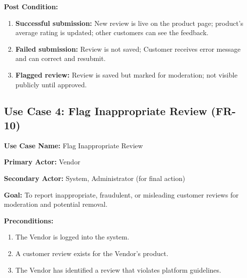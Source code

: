 \textbf{Post Condition:}
\begin{enumerate}
    \item \textbf{Successful submission:} New review is live on the product page; product's average rating is updated; other customers can see the feedback.
    \item \textbf{Failed submission:} Review is not saved; Customer receives error message and can correct and resubmit.
    \item \textbf{Flagged review:} Review is saved but marked for moderation; not visible publicly until approved.
\end{enumerate}


\subsection*{Use Case 4: Flag Inappropriate Review (FR-10)}

\textbf{Use Case Name:} Flag Inappropriate Review

\textbf{Primary Actor:} Vendor

\textbf{Secondary Actor:} System, Administrator (for final action)

\textbf{Goal:} To report inappropriate, fraudulent, or misleading customer reviews for moderation and potential removal.

\textbf{Preconditions:}
\begin{enumerate}
    \item The Vendor is logged into the system.
    \item A customer review exists for the Vendor's product.
    \item The Vendor has identified a review that violates platform guidelines.
\end{enumerate}


